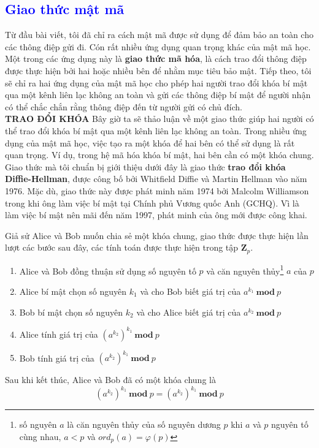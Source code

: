\textcolor{blue}{\section{Giao thức mật mã}}
Từ đầu bài viết, tôi đã chỉ ra cách mật mã được sử dụng để đảm bảo an
toàn cho các thông điệp gửi đi. Cón rất nhiều ứng dụng quan trọng khác của
mật mã học. Một trong các ứng dụng này là \textbf{giao thức mã hóa}, là cách trao đổi
thông điệp được thực hiện bởi hai hoặc nhiều bên để nhằm mục tiêu bảo
mật. Tiếp theo, tôi sẽ chỉ ra hai ứng dụng của mật mã học cho
phép hai người trao đổi khóa bí mật qua một kênh liên lạc không an toàn
và gửi các thông điệp bí mật để người nhận có thể chắc chắn rằng thông điệp đến từ người gửi có chủ đích. \\

\noindent \textcolor{Mycolor}{\textbf{TRAO ĐỔI KHÓA}} Bây giờ ta sẽ thảo luận về một giao thức giúp hai người có thể trao đổi khóa bí mật qua một kênh liên lạc không an toàn.
Trong nhiều ứng dụng của mật mã học, việc tạo ra một khóa để hai bên có thể sử dụng là rất quan trọng. Ví dụ, trong hệ mã hóa khóa bí mật, hai bên cần có một khóa chung.
Giao thức mà tôi chuẩn bị giới thiệu dưới đây là giao thức \textbf{trao đổi khóa Diffie-Hellman}, được công bố bởi Whitfield Diffie và Martin Hellman vào năm 1976.
Mặc dù, giao thức này được phát minh năm 1974 bởi Malcolm Williamson
trong khi ông làm việc bí mật tại Chính phủ Vương quốc Anh (GCHQ). Vì là làm việc bí mật nên mãi đến năm 1997, phát minh của ông mới
được công khai.

Giả sử Alice và Bob muốn chia sẻ một khóa chung, giao thức được thực hiện lần lượt các bước sau đây, các tính toán được thực hiện trong tập $\mathbf{Z}_p$. \\
\begin{enumerate}[label=\arabic*)]
    \item Alice và Bob đồng thuận sử dụng số nguyên tố $p$ và căn nguyên thủy\footnote{số nguyên $a$ là căn nguyên thủy của số nguyên dương $p$ khi $a$ và $p$ nguyên tố cùng nhau, $a<p$ và \mbox{$ord_{p}(a)=\varphi(p)$}} $a$ của $p$
    \item Alice bí mật chọn số nguyên $k_1$ và cho Bob biết giá trị của $a^{k_1}\ \mathbf{mod}\ p$
    \item Bob bí mật chọn số nguyên $k_2$ và cho Alice biết giá trị của $a^{k_2}\ \mathbf{mod}\ p$
    \item Alice tính giá trị của $(a^{k_2})^{k_1}\ \mathbf{mod}\ p$
    \item Bob tính giá trị của $(a^{k_2})^{k_1}\ \mathbf{mod}\ p$
\end{enumerate}
Sau khi kết thúc, Alice và Bob đã có một khóa chung là
$$(a^{k_2})^{k_1}\ \mathbf{mod}\ p = (a^{k_2})^{k_1}\ \mathbf{mod}\ p$$

